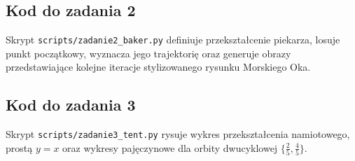 \documentclass[11pt,a4paper]{article}
\theoremstyle{plain}
\theoremstyle{definition}
\newcounter{zadanie}
\begin{document}


\subsection{Kod do zadania 2}

Skrypt \texttt{scripts/zadanie2\_baker.py} definiuje przekszta\l cenie piekarza, losuje punkt
pocz\k{a}tkowy, wyznacza jego trajektori\k{e} oraz generuje obrazy przedstawiaj\k{a}ce kolejne iteracje
stylizowanego rysunku Morskiego Oka.



\subsection{Kod do zadania 3}

Skrypt \texttt{scripts/zadanie3\_tent.py} rysuje wykres przekszta\l cenia namiotowego, prost\k{a}
\(y=x\) oraz wykresy paj\k{e}czynowe dla orbity dwucyklowej \(\{\tfrac{2}{5},\tfrac{4}{5}\}\).


\end{document}
